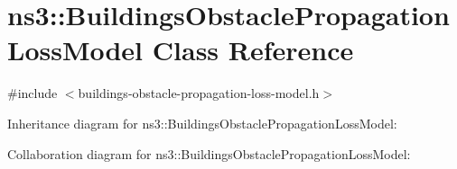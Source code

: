 \hypertarget{classns3_1_1BuildingsObstaclePropagationLossModel}{}\section{ns3\+:\+:Buildings\+Obstacle\+Propagation\+Loss\+Model Class Reference}
\label{classns3_1_1BuildingsObstaclePropagationLossModel}


{\ttfamily \#include $<$buildings-\/obstacle-\/propagation-\/loss-\/model.\+h$>$}



Inheritance diagram for ns3\+:\+:Buildings\+Obstacle\+Propagation\+Loss\+Model\+:


Collaboration diagram for ns3\+:\+:Buildings\+Obstacle\+Propagation\+Loss\+Model\+:
